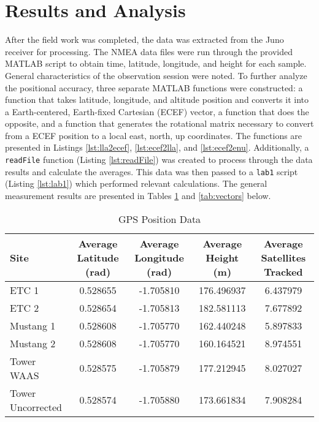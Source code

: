 \documentclass[11pt]{article}
\begin{document}
\section{Results and Analysis}
After the field work was completed, the data was extracted from the Juno receiver for processing. The NMEA data files were run through the provided MATLAB script to obtain time, latitude, longitude, and height for each sample. General characteristics of the observation session were noted. To further analyze the positional accuracy, three separate MATLAB functions were constructed: a function that takes latitude, longitude, and altitude position and converts it into a Earth-centered, Earth-fixed Cartesian (ECEF) vector, a function that does the opposite, and a function that generates the rotational matrix necessary to convert from a ECEF position to a local east, north, up coordinates. The functions are presented in Listings \ref{lst:lla2ecef}, \ref{lst:ecef2lla}, and \ref{lst:ecef2enu}. %
Additionally, a \verb|readFile| function (Listing \ref{lst:readFile}) was created to process through the data results and calculate the averages. This data was then passed to a \verb|lab1| script (Listing \ref{lst:lab1}) which performed relevant calculations. The general measurement results are presented in Tables \ref{tab:samples} and \ref{tab:vectors} below.
\begin{table}[h]
\centering
\begin{adjustbox}{max width=\textwidth}
\begin{tabular}{l|cccc}
Site              & Average Latitude (rad) & Average Longitude (rad) & Average Height (m) & Average Satellites Tracked \\ \hline
ETC 1             & 0.528655               & -1.705810               & 176.496937         & 6.437979                   \\ \hline
ETC 2             & 0.528654               & -1.705813               & 182.581113         & 7.677892                   \\ \hline
Mustang 1         & 0.528608               & -1.705770               & 162.440248         & 5.897833                   \\ \hline
Mustang 2         & 0.528608               & -1.705770               & 160.164521         & 8.974551                   \\ \hline
Tower WAAS        & 0.528575               & -1.705879               & 177.212945         & 8.027027                   \\ \hline
Tower Uncorrected & 0.528574               & -1.705880               & 173.661834         & 7.908284                  
\end{tabular}
\end{adjustbox}
\caption{GPS Position Data}
\label{tab:samples}
\end{table}
\end{document}
